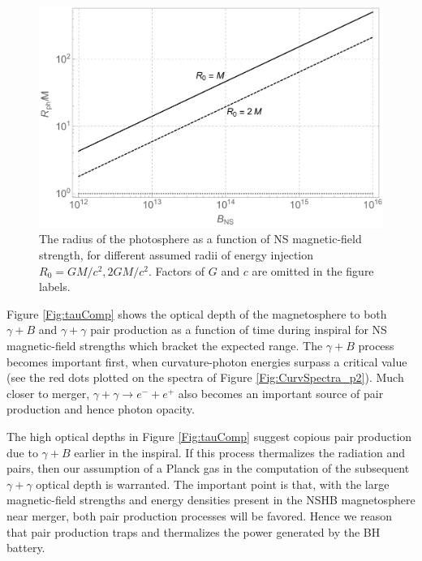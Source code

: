 \begin{figure}
\begin{center}
\includegraphics[scale=0.32]{figures/ch7/RPhot_vs_BNS_M10.pdf}
\end{center}
\caption{The radius of the photosphere as a function of NS
  magnetic-field strength, for different assumed radii of energy
  injection $R_0=GM/c^2, 2GM/c^2$. Factors of $G$ and $c$ are omitted
  in the figure labels.}
\label{Fig:Rphot}
\end{figure}




Figure \ref{Fig:tauComp} shows the optical depth of the magnetosphere
to both $\gamma + B$ and $\gamma + \gamma$ pair production as a
function of time during inspiral for NS magnetic-field strengths which
bracket the expected range. The $\gamma + B$ process becomes important
first, when curvature-photon energies surpass a critical value (see
the red dots plotted on the spectra of Figure
\ref{Fig:CurvSpectra_p2}). Much closer to merger, $\gamma + \gamma
\rightarrow e^- + e^+$ also becomes an important source of pair
production and hence photon opacity.

The high optical depths in Figure \ref{Fig:tauComp} suggest copious
pair production due to $\gamma + B$ earlier in the inspiral.  If this
process thermalizes the radiation and pairs, then our assumption of a
Planck gas in the computation of the subsequent $\gamma + \gamma$
optical depth is warranted. The important point is that, with the
large magnetic-field strengths and energy densities present in the
NSHB magnetosphere near merger, both pair production processes will be
favored. Hence we reason that pair production traps and thermalizes
the power generated by the BH battery.


